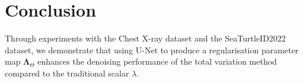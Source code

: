 \documentclass[12pt]{article}
\begin{document}




\section{Conclusion}


Through experiments with the Chest X-ray dataset and the SeaTurtleID2022 dataset, we demonstrate that using U-Net to produce a regularisation parameter map $\mathbf{\Lambda}_{\Theta}$ enhances the denoising performance of the total variation method compared to the traditional scalar $\lambda$.



\end{document}
